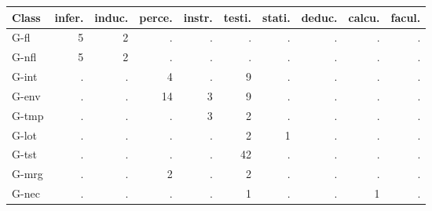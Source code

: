 \begin{center}\small
\begin{tabular}{@{}lrrrrrrrrr@{}}\toprule
Class & infer. & induc. & perce. & instr. & testi. & stati. & deduc. & calcu. & facul. \\ \midrule
G-fl & 5 & 2 & . & . & . & . & . & . & . \\
G-nfl & 5 & 2 & . & . & . & . & . & . & . \\
G-int & . & . & 4 & . & 9 & . & . & . & . \\
G-env & . & . & 14 & 3 & 9 & . & . & . & . \\
G-tmp & . & . & . & 3 & 2 & . & . & . & . \\
G-lot & . & . & . & . & 2 & 1 & . & . & . \\
G-tst & . & . & . & . & 42 & . & . & . & . \\
G-mrg & . & . & 2 & . & 2 & . & . & . & . \\
G-nec & . & . & . & . & 1 & . & . & 1 & . \\
\bottomrule\end{tabular}\end{center}
